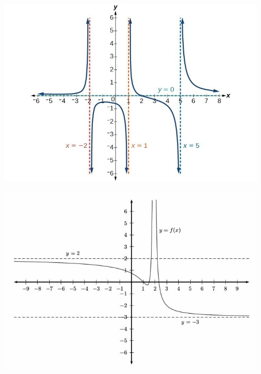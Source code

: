 \documentclass[12pt]{article}
\begin{document}
\begin{minipage}{0.32\textwidth}
    \begin{center}
        \includegraphics[scale=0.2]{Vertical asymptotes.jpg}
    \end{center}
\end{minipage}
\begin{minipage}{0.33\textwidth}
    \begin{center}
        \includegraphics[scale=0.2]{Horizontal asymptotes.jpg}
    \end{center}
\end{minipage}
\end{document}
